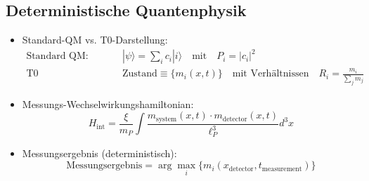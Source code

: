 \documentclass[12pt,a4paper]{article}
\begin{document}
	\subsection{Deterministische Quantenphysik}
	\begin{itemize}
		\item Standard-QM vs. T0-Darstellung:
		\begin{align}
			\text{Standard QM:} &\quad |\psi\rangle = \sum_i c_i |i\rangle \quad \text{mit} \quad P_i = |c_i|^2 \\
			\text{T0 Deterministisch:} &\quad \text{Zustand} \equiv \{m_i(x,t)\} \quad \text{mit Verhältnissen} \quad R_i = \frac{m_i}{\sum_j m_j}
		\end{align}
		
		\item Messungs-Wechselwirkungshamiltonian:
		\begin{equation}
			H_{\text{int}} = \frac{\xi}{m_P} \int \frac{m_{\text{system}}(x,t) \cdot m_{\text{detector}}(x,t)}{\ell_P^3} d^3x
		\end{equation}
		
		\item Messungsergebnis (deterministisch):
		\begin{equation}
			\text{Messungsergebnis} = \arg\max_i\{m_i(x_{\text{detector}}, t_{\text{measurement}})\}
		\end{equation}
	\end{itemize}
	
\end{document}
